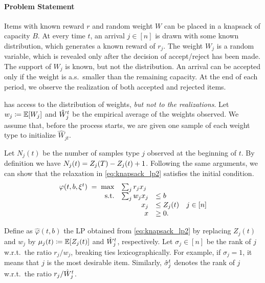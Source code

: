 \paragraph{Problem Statement}
Items with known reward $r$ and random weight $W$ can be placed in a knapsack of capacity $B$.
At every time $t$, an arrival $j\in[n]$ is drawn with some known distribution, which generates a known reward of $r_j$.
The weight $W_j$ is a random variable, which is revealed only after the decision of accept/reject has been made.
The support of $W_j$ is known, but not the distribution.
An arrival can be accepted only if the weight is a.s.\ smaller than the remaining capacity.
At the end of each period, we observe the realization of both accepted and rejected items.

\off has access to the distribution of weights, \emph{but not to the realizations}.
Let $w_j\coloneqq \mathbb{E}[W_j]$ and $\hat W^t_j$ be the empirical average of the weights observed.
We assume that, before the process starts, we are given one sample of each weight type to initialize $\hat W_{jt}$.

Let $N_j(t)$ be the number of samples type $j$ observed at the beginning of $t$.
By definition we have $N_j(t)=Z_j(T)-Z_j(t)+1$.
Following the same arguments, we can show that the relaxation in \cref{eq:knapsack_lp2} satisfies the initial condition.
\begin{equation}\label{eq:knapsack_lp2}
\begin{array}{rrll}
\varphi(t,b,\xit) \; = \; \max & \multicolumn{3}{l}{\sum_{j}r_{j}x_j} \\
\text{s.t.}& \sum_{j} w_jx_j  &\leq b  \\
&  x_j & \leq Z_j(t)  & j\in [n] \\
& x&\geq 0.
\end{array}
\end{equation}

Define as $\hat \varphi(t,b)$ the LP obtained from \cref{eq:knapsack_lp2} by replacing $Z_j(t)$ and $w_j$ by $\mu_j(t)\coloneqq\mathbb{E}[Z_j(t)]$ and $\hat W^t_j$, respectively.
Let $\sigma_j\in[n]$ be the rank of $j$ w.r.t.\ the ratio $r_j/w_j$, breaking ties lexicographically. 
For example, if $\sigma_j=1$, it means that $j$ is the most desirable item.
Similarly, $\hat\sigma^t_j$ denotes the rank of $j$ w.r.t.\ the ratio $r_j/\hat W^t_j$.

